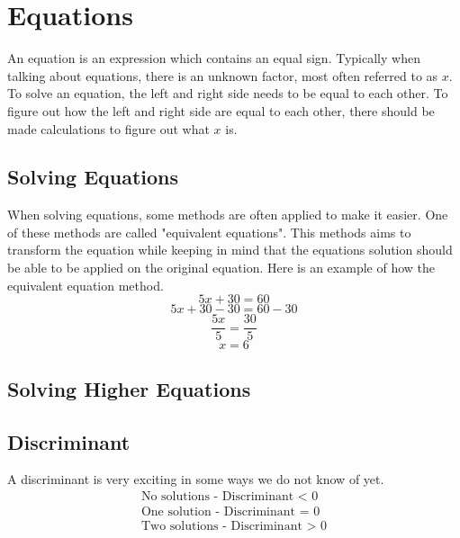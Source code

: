 \section{Equations}
An equation is an expression which contains an equal sign. Typically when talking about equations, there is an unknown factor, most often referred to as \(x\). To solve an equation, the left and right side needs to be equal to each other. To figure out how the left and right side are equal to each other, there should be made calculations to figure out what \(x\) is.
\subsection{Solving Equations}
When solving equations, some methods are often applied to make it easier. One of these methods are called "equivalent equations". This methods aims to transform the equation while keeping in mind that the equations solution should be able to be applied on the original equation. 
\newline
Here is an example of how the equivalent equation method.
\[ 5x+30 = 60 \]
\[ 5x+30-30 = 60-30 \]
\[ \frac{5x}{5} = \frac{30}{5} \]
\[ x = 6 \]
\subsection{Solving Higher Equations}

\subsection*{Discriminant}

A discriminant is very exciting in some ways we do not know of yet.
\begin{align*}
    \text{No solutions - Discriminant < 0}    \\
    \text{One solution - Discriminant = 0}    \\
    \text{Two solutions - Discriminant > 0}       
\end{align*}




